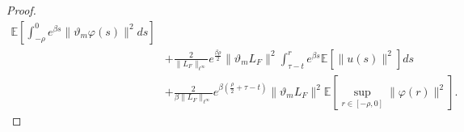 \documentclass[11pt]{article}
\numberwithin{equation}{section}
\theoremstyle{plain}
\begin{document}
\begin{proof}
\begin{align}
            \mathbb{E}
               \left[ \int_{-\rho}^{0} e^{\beta s} \|\vartheta_m \varphi(s)\|^2 ds \right]  \nonumber\\
        & + \frac{2}{\|L_{F}\|_{\ell^\infty} } 
                   e^{\frac{\beta \rho}{2} } 
                         \|\vartheta_m L_{F}\|^2
                             \int_{\tau-t}^{r} e^{\beta s}
                                  \mathbb{E} \left[ \|u(s)\|^2 \right] ds  \nonumber\\            
        & + \frac{2}{ \beta \|L_{F}\|_{\ell^\infty} } 
                     e^{\beta (\frac{\rho}{2} + \tau -t)} 
                            \|\vartheta_m L_{F}\|^2
                                  \mathbb{E}
                                         \left[ \sup_{r \in [-\rho, 0]}\|\varphi(r)\|^2 
                                         \right].
 \end{align}


\end{proof}
\end{document}
